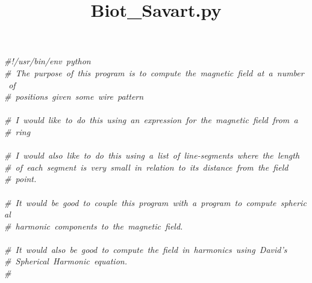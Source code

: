 \documentclass{article}
\title{Biot_Savart.py}
\newcommand{\hlstd}[1]{\textcolor[rgb]{0,0,0}{#1}}
\newcommand{\hlslc}[1]{\textcolor[rgb]{0.51,0.51,0.51}{\it{#1}}}
\begin{document}
\pagecolor{bgcolor}
\noindent
\ttfamily
\hlstd{}\hlslc{\#!/usr/bin/env\ python}\hspace*{\fill}\\
\hlstd{}\hlslc{\#\ The\ purpose\ of\ this\ program\ is\ to\ compute\ the\ magnetic\ field\ at\ a\ number\ of}\hspace*{\fill}\\
\hlstd{}\hlslc{\#\ positions\ given\ some\ wire\ pattern}\hspace*{\fill}\\
\hlstd{}\hspace*{\fill}\\
\hlslc{\#\ I\ would\ like\ to\ do\ this\ using\ an\ expression\ for\ the\ magnetic\ field\ from\ a}\hspace*{\fill}\\
\hlstd{}\hlslc{\#\ ring}\hspace*{\fill}\\
\hlstd{}\hspace*{\fill}\\
\hlslc{\#\ I\ would\ also\ like\ to\ do\ this\ using\ a\ list\ of\ line{-}segments\ where\ the\ length}\hspace*{\fill}\\
\hlstd{}\hlslc{\#\ of\ each\ segment\ is\ very\ small\ in\ relation\ to\ its\ distance\ from\ the\ field}\hspace*{\fill}\\
\hlstd{}\hlslc{\#\ point.}\hspace*{\fill}\\
\hlstd{}\hspace*{\fill}\\
\hlslc{\#\ It\ would\ be\ good\ to\ couple\ this\ program\ with\ a\ program\ to\ compute\ spherical}\hspace*{\fill}\\
\hlstd{}\hlslc{\#\ harmonic\ components\ to\ the\ magnetic\ field.}\hspace*{\fill}\\
\hlstd{}\hspace*{\fill}\\
\hlslc{\#\ It\ would\ also\ be\ good\ to\ compute\ the\ field\ in\ harmonics\ using\ David's\ }\hspace*{\fill}\\
\hlstd{}\hlslc{\#\ Spherical\ Harmonic\ equation.}\hspace*{\fill}\\
\hlstd{}\hlslc{\#}\hspace*{\fill}\\
\end{document}
